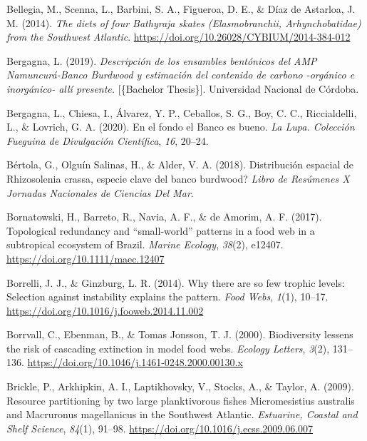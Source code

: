 \documentclass[preprint, 3p,
authoryear]{elsarticle} %
\newlength{\cslhangindent}
\newlength{\cslentryspacingunit} %
\newenvironment{CSLReferences}[2] %
 {%
  \setlength{\parindent}{0pt}
  \ifodd #1
  \let\oldpar\par
  \def\par{\hangindent=\cslhangindent\oldpar}
  \fi
  \setlength{\parskip}{#2\cslentryspacingunit}
 }%
 {}
\begin{document}
\begin{CSLReferences}{1}{0}
\leavevmode{}%
Bellegia, M., Scenna, L., Barbini, S. A., Figueroa, D. E., \& Díaz de
Astarloa, J. M. (2014). \emph{The diets of four {Bathyraja} skates
({Elasmobranchii}, {Arhynchobatidae}) from the {Southwest Atlantic}}.
\url{https://doi.org/10.26028/CYBIUM/2014-384-012}

\leavevmode{}%
Bergagna, L. (2019). \emph{{Descripción de los ensambles bentónicos del
AMP Namuncurá-Banco Burdwood y estimación del contenido de carbono
-orgánico e inorgánico- allí presente.}} {[}\{Bachelor Thesis\}{]}.
Universidad Nacional de Córdoba.

\leavevmode{}%
Bergagna, L., Chiesa, I., Álvarez, Y. P., Ceballos, S. G., Boy, C. C.,
Riccialdelli, L., \& Lovrich, G. A. (2020). {En el fondo el Banco es
bueno}. \emph{La Lupa. Colección Fueguina de Divulgación Científica},
\emph{16}, 20--24.

\leavevmode{}%
Bértola, G., Olguín Salinas, H., \& Alder, V. A. (2018). Distribución
espacial de {Rhizosolenia} crassa, \textquestiondown especie clave del
banco burdwood? \emph{Libro de Resúmenes {X Jornadas Nacionales} de
{Ciencias} Del {Mar}}.

\leavevmode{}%
Bornatowski, H., Barreto, R., Navia, A. F., \& de Amorim, A. F. (2017).
Topological redundancy and {``small-world''} patterns in a food web in a
subtropical ecosystem of {Brazil}. \emph{Marine Ecology}, \emph{38}(2),
e12407. \url{https://doi.org/10.1111/maec.12407}

\leavevmode{}%
Borrelli, J. J., \& Ginzburg, L. R. (2014). Why there are so few trophic
levels: {Selection} against instability explains the pattern. \emph{Food
Webs}, \emph{1}(1), 10--17.
\url{https://doi.org/10.1016/j.fooweb.2014.11.002}

\leavevmode{}%
Borrvall, C., Ebenman, B., \& Tomas Jonsson, T. J. (2000). Biodiversity
lessens the risk of cascading extinction in model food webs.
\emph{Ecology Letters}, \emph{3}(2), 131--136.
\url{https://doi.org/10.1046/j.1461-0248.2000.00130.x}

\leavevmode{}%
Brickle, P., Arkhipkin, A. I., Laptikhovsky, V., Stocks, A., \& Taylor,
A. (2009). Resource partitioning by two large planktivorous fishes
{Micromesistius} australis and {Macruronus} magellanicus in the
{Southwest Atlantic}. \emph{Estuarine, Coastal and Shelf Science},
\emph{84}(1), 91--98. \url{https://doi.org/10.1016/j.ecss.2009.06.007}


\end{CSLReferences}
\end{document}
